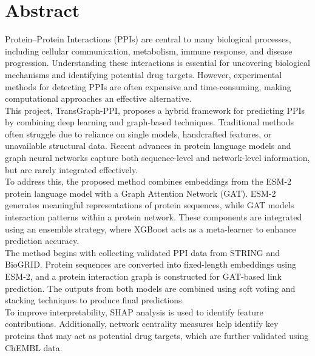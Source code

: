 \documentclass[12pt,a4paper]{report}
\begin{document}
\pagestyle{plain}
\chapter*{\centering Abstract}

{

\vspace{-0.4cm}

\noindent Protein–Protein Interactions (PPIs) are central to many biological processes, including cellular communication, metabolism, immune response, and disease progression. Understanding these interactions is essential for uncovering biological mechanisms and identifying potential drug targets. However, experimental methods for detecting PPIs are often expensive and time-consuming, making computational approaches an effective alternative.\\

\noindent This project, TransGraph-PPI, proposes a hybrid framework for predicting PPIs by combining deep learning and graph-based techniques. Traditional methods often struggle due to reliance on single models, handcrafted features, or unavailable structural data. Recent advances in protein language models and graph neural networks capture both sequence-level and network-level information, but are rarely integrated effectively.\\

\noindent To address this, the proposed method combines embeddings from the ESM-2 protein language model with a Graph Attention Network (GAT). ESM-2 generates meaningful representations of protein sequences, while GAT models interaction patterns within a protein network. These components are integrated using an ensemble strategy, where XGBoost acts as a meta-learner to enhance prediction accuracy.\\

\noindent The method begins with collecting validated PPI data from STRING and BioGRID. Protein sequences are converted into fixed-length embeddings using ESM-2, and a protein interaction graph is constructed for GAT-based link prediction. The outputs from both models are combined using soft voting and stacking techniques to produce final predictions.\\

\noindent To improve interpretability, SHAP analysis is used to identify feature contributions. Additionally, network centrality measures help identify key proteins that may act as potential drug targets, which are further validated using ChEMBL data.\\

}
\end{document}
